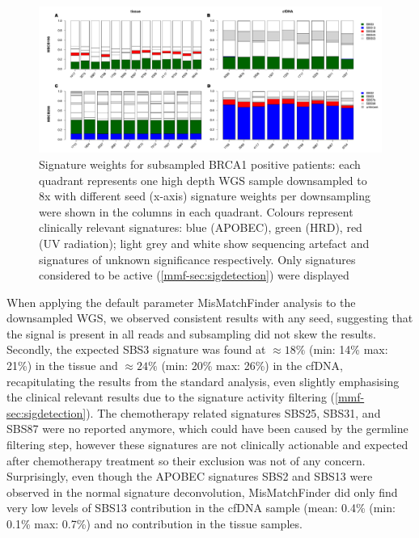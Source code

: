 \begin{figure}[ht]
\centering
\includegraphics[width=.99\linewidth]{Figures/MisMatchFinder/brca1BarPlots.pdf}
\caption[Signature weights for subsampled BRCA1 positive patients]{Signature weights for subsampled BRCA1 positive patients: each quadrant represents one high depth WGS sample downsampled to 8x with different seed (x-axis) signature weights per downsampling were shown in the columns in each quadrant. Colours represent clinically relevant signatures: blue (APOBEC), green (HRD), red (UV radiation); light grey and white show sequencing artefact and signatures of unknown significance respectively. Only signatures considered to be active (\autoref{mmf-sec:sigdetection}) were displayed}\label{fig:mmf-mbcbBarPlot}
\end{figure}

When applying the default parameter MisMatchFinder analysis to the downsampled WGS, we observed consistent results with any seed, suggesting that the signal is present in all reads and subsampling did not skew the results. Secondly, the expected SBS3 signature was found at $\approx 18\%$ (min: 14\% max: 21\%) in the tissue and $\approx 24\%$ (min: 20\% max: 26\%) in the cfDNA, recapitulating the results from the standard analysis, even slightly emphasising the clinical relevant results due to the signature activity filtering (\autoref{mmf-sec:sigdetection}). The chemotherapy related signatures SBS25, SBS31, and SBS87 were no reported anymore, which could have been caused by the germline filtering step, however these signatures are not clinically actionable and expected after chemotherapy treatment so their exclusion was not of any concern. Surprisingly, even though the APOBEC signatures SBS2 and SBS13 were observed in the normal signature deconvolution, MisMatchFinder did only find very low levels of SBS13 contribution in the cfDNA sample (mean: 0.4\% (min: 0.1\% max: 0.7\%) and no contribution in the tissue samples. 

